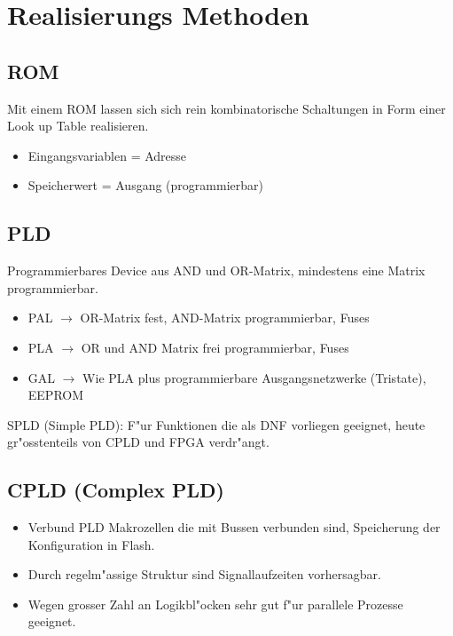 \section{Realisierungs Methoden}
\subsection{ROM}
Mit einem ROM lassen sich sich rein kombinatorische Schaltungen in Form einer Look up Table realisieren.\\
\begin{itemize}
	\setlength{\itemsep}{1pt}
  \setlength{\parskip}{0pt}
  \setlength{\parsep}{0pt}
  
	\item Eingangsvariablen = Adresse\\
	\item Speicherwert = Ausgang (programmierbar)\\
\end{itemize}



\subsection{PLD}
Programmierbares Device aus AND und OR-Matrix, mindestens eine Matrix programmierbar.
\begin{itemize}
	\setlength{\itemsep}{1pt}
  \setlength{\parskip}{0pt}
  \setlength{\parsep}{0pt}
  
	\item PAL $\rightarrow$ OR-Matrix fest, AND-Matrix programmierbar, Fuses\\
	\item PLA $\rightarrow$ OR und AND Matrix frei programmierbar, Fuses\\
	\item GAL $\rightarrow$ Wie PLA plus programmierbare Ausgangsnetzwerke (Tristate), EEPROM\\
\end{itemize}
SPLD (Simple PLD): F"ur Funktionen die als DNF vorliegen geeignet, heute gr"osstenteils von CPLD und FPGA verdr"angt.\\

\subsection{CPLD (Complex PLD)}
\begin{itemize}
	\setlength{\itemsep}{1pt}
  \setlength{\parskip}{0pt}
  \setlength{\parsep}{0pt}
  
	\item Verbund PLD Makrozellen die mit Bussen verbunden sind, Speicherung der Konfiguration in Flash.\\
	\item	Durch regelm"assige Struktur sind Signallaufzeiten vorhersagbar.\\
	\item Wegen grosser Zahl an Logikbl"ocken sehr gut f"ur parallele Prozesse geeignet.\\
\end{itemize}


